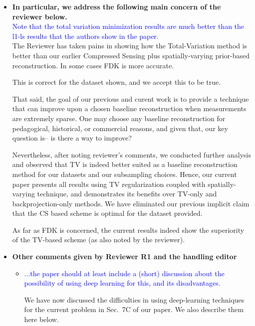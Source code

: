 \documentclass{article}
\begin{document}
\begin{itemize}
\item \textbf{In particular, we address the following main concern of the reviewer below.}\\
  
    \textcolor{blue}{Note that the total
variation minimization results are much better than the l1-ls results that the authors show in the
paper.}\\
    
The Reviewer has taken pains in showing how the Total-Variation method
is better than our earlier Compressed Sensing plus spatially-varying
prior-based reconstruction. In some cases FDK is more accurate.

This is correct for the dataset shown, and we accept this to be true.

  That said, the goal of our previous and curent work is to provide a
  technique that can improve upon a chosen baseline reconstruction
  when measurements are extremely sparse.  One may choose any baseline
  reconstruction for pedagogical, historical, or commercial reasons,
  and given that, our key question is-- is there a way to improve?
  
  Nevertheless, after noting reviewer's comments, we conducted further
  analysis and observed that TV is indeed better suited as a baseline
  reconstruction method for our datasets and our subsampling
  choices. Hence, our current paper presents all results using TV
  regularization coupled with spatially-varying technique, and
  demonstrates its benefits over TV-only and backprojection-only
  methods.  We have eliminated our previous implicit claim that the CS
  based scheme is optimal for the dataset provided.

  As far as FDK is concerned, the current results indeed show the
  superiority of the TV-based scheme (as also noted by the reviewer).
  \clearpage
\item \textbf{Other comments given by Reviewer R1 and the handling editor}

 \begin{itemize}
 \item    \textcolor{blue}{...the paper should at least include a (short) discussion about the
     possibility of using deep learning for this, and its disadvantages.}

   We have now discussed the difficulties in using deep-learning
   techniques for the current problem in Sec.~7C of our paper. We also
   describe them here below.
   

\end{itemize}
\end{itemize}
\end{document}

